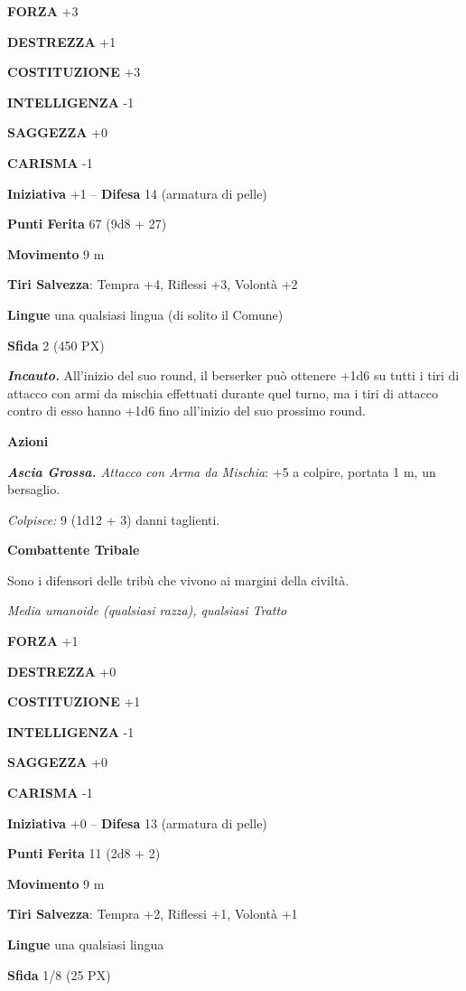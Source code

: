 \begin{multicols}{2}
	\textbf{FORZA} +3

	\textbf{DESTREZZA} +1

	\textbf{COSTITUZIONE} +3

	\textbf{INTELLIGENZA} -1

	\textbf{SAGGEZZA} +0

	\textbf{CARISMA} -1

	\textbf{Iniziativa} +1 -- \textbf{Difesa} 14 (armatura di pelle)

	\textbf{Punti Ferita} 67 (9d8 + 27)

	\textbf{Movimento} 9 m

	\textbf{Tiri Salvezza}: Tempra +4, Riflessi +3, Volontà +2

	\textbf{Lingue} una qualsiasi lingua (di solito il Comune)

	\textbf{Sfida} 2 (450 PX)

	\textit{\textbf{Incauto.}} All'inizio del suo round, il berserker può ottenere +1d6 su tutti i tiri di attacco con armi da mischia effettuati durante quel turno, ma i tiri di attacco contro di esso hanno +1d6 fino all'inizio del suo prossimo round.

	\textbf{Azioni}

	\textit{\textbf{Ascia Grossa.} Attacco con Arma da Mischia}: +5 a colpire, portata 1 m, un bersaglio.

	\textit{Colpisce:} 9 (1d12 + 3) danni taglienti.

	\textbf{Combattente Tribale}

	Sono i difensori delle tribù che vivono ai margini della civiltà.

	\textit{Media umanoide (qualsiasi razza), qualsiasi Tratto}

	\textbf{FORZA} +1

	\textbf{DESTREZZA} +0

	\textbf{COSTITUZIONE} +1

	\textbf{INTELLIGENZA} -1

	\textbf{SAGGEZZA} +0

	\textbf{CARISMA} -1

	\textbf{Iniziativa} +0 -- \textbf{Difesa} 13 (armatura di pelle)

	\textbf{Punti Ferita} 11 (2d8 + 2)

	\textbf{Movimento} 9 m

	\textbf{Tiri Salvezza}: Tempra +2, Riflessi +1, Volontà +1

	\textbf{Lingue} una qualsiasi lingua

	\textbf{Sfida} 1/8 (25 PX)


\end{multicols}
